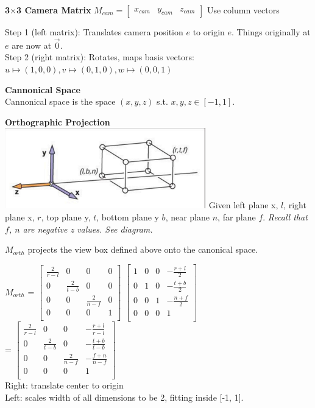 \documentclass[letterpaper, 8pt]{extarticle}
\begin{document}
\begin{multicols*}{4}
\textbf{3\(\times\)3 Camera Matrix}
\(
M_{cam}
= \begin{bmatrix}
    x_{cam} & y_{cam} & z_{cam}
\end{bmatrix}
\)
Use column vectors

Step 1 (left matrix): Translates camera position $e$ to origin $e$. Things originally at $e$ are now at $\vec{0}$.\\
Step 2 (right matrix): Rotates, maps basis vectors: $u \mapsto (1,0,0), v \mapsto (0,1,0), w \mapsto (0,0,1)$

\textbf{Cannonical Space}\\
Cannonical space is the space $(x, y, z)$ s.t. $x,y,z \in [-1, 1]$.

\textbf{Orthographic Projection}\\

\includegraphics[width=.5\linewidth]{cam-ortho.png}
Given left plane x, $l$, right plane x, $r$, top plane y, $t$, bottom plane y $b$, near plane $n$, far plane $f$.
\textit{Recall that $f$, $n$ are negative z values. See diagram.}

$M_{orth}$ projects the view box defined above onto the canonical space.


$M_{orth}$ = \(
\begin{bmatrix}
    \frac{2}{r-l} & 0             & 0             & 0 \\
    0             & \frac{2}{t-b} & 0             & 0 \\
    0             & 0             & \frac{2}{n-f} & 0 \\
    0             & 0             & 0             & 1 \\
\end{bmatrix}
\)
\(
\begin{bmatrix}
    1 & 0 & 0 & -\frac{r+l}{2} \\
    0 & 1 & 0 & -\frac{t+b}{2} \\
    0 & 0 & 1 & -\frac{n+f}{2} \\
    0 & 0 & 0 & 1              \\
\end{bmatrix}
\)\\
=
\(
\begin{bmatrix}
    \frac{2}{r-l} & 0             & 0             & -\frac{r+l}{r-l} \\
    0             & \frac{2}{t-b} & 0             & -\frac{t+b}{t-b} \\
    0             & 0             & \frac{2}{n-f} & -\frac{f+n}{n-f} \\
    0             & 0             & 0             & 1                \\
\end{bmatrix}
\)\\
Right: translate center to origin\\
Left: scales width of all dimensions to be 2, fitting inside [-1, 1].


\end{multicols*}
\end{document}
